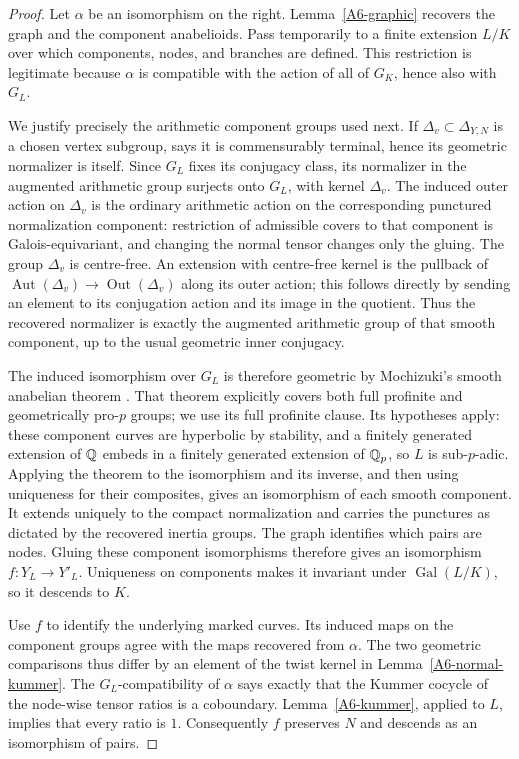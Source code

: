 \begin{proof}
Let $\alpha$ be an isomorphism on the right. Lemma~\ref{A6-graphic} recovers the graph and the component anabelioids. Pass temporarily to a finite extension $L/K$ over which components, nodes, and branches are defined. This restriction is legitimate because $\alpha$ is compatible with the action of all of $G_K$, hence also with $G_L$.

We justify precisely the arithmetic component groups used next. If $\Delta_v\subset\Delta_{Y,N}$ is a chosen vertex subgroup, \cite[Proposition 1.2(ii)]{Mochizuki2007A567} says it is commensurably terminal, hence its geometric normalizer is itself. Since $G_L$ fixes its conjugacy class, its normalizer in the augmented arithmetic group surjects onto $G_L$, with kernel $\Delta_v$. The induced outer action on $\Delta_v$ is the ordinary arithmetic action on the corresponding punctured normalization component: restriction of admissible covers to that component is Galois-equivariant, and changing the normal tensor changes only the gluing. The group $\Delta_v$ is centre-free. An extension with centre-free kernel is the pullback of $\operatorname{Aut}(\Delta_v)\to\operatorname{Out}(\Delta_v)$ along its outer action; this follows directly by sending an element to its conjugation action and its image in the quotient. Thus the recovered normalizer is exactly the augmented arithmetic group of that smooth component, up to the usual geometric inner conjugacy.

The induced isomorphism over $G_L$ is therefore geometric by Mochizuki's smooth anabelian theorem \cite[Theorem A, equivalently Theorem 16.5]{Mochizuki1999A567}. That theorem explicitly covers both full profinite and geometrically pro-$p$ groups; we use its full profinite clause. Its hypotheses apply: these component curves are hyperbolic by stability, and a finitely generated extension of ${\mathbb{Q}}$ embeds in a finitely generated extension of ${\mathbb{Q}}_p$, so $L$ is sub-$p$-adic. Applying the theorem to the isomorphism and its inverse, and then using uniqueness for their composites, gives an isomorphism of each smooth component. It extends uniquely to the compact normalization and carries the punctures as dictated by the recovered inertia groups. The graph identifies which pairs are nodes. Gluing these component isomorphisms therefore gives an isomorphism $f:Y_L\to Y'_L$. Uniqueness on components makes it invariant under $\operatorname{Gal}(L/K)$, so it descends to $K$.

Use $f$ to identify the underlying marked curves. Its induced maps on the component groups agree with the maps recovered from $\alpha$. The two geometric comparisons thus differ by an element of the twist kernel in Lemma~\ref{A6-normal-kummer}. The $G_L$-compatibility of $\alpha$ says exactly that the Kummer cocycle of the node-wise tensor ratios is a coboundary. Lemma~\ref{A6-kummer}, applied to $L$, implies that every ratio is $1$. Consequently $f$ preserves $N$ and descends as an isomorphism of pairs.


\end{proof}
